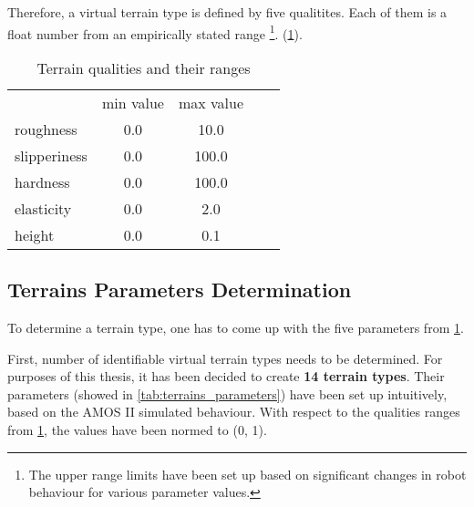 Therefore, a virtual terrain type is defined by five qualitites. Each of them is a float number from an empirically stated range \footnote{The upper range limits have been set up based on significant changes in robot behaviour for various parameter values.}. (\cref{tab:terrain_qualities}).

\begin{table}[H]
\centering
\caption{Terrain qualities and their ranges}
\label{tab:terrain_qualities}
\begin{tabular}{lccll}
             & min value & max value \\
roughness    & 0.0       & 10.0      \\
slipperiness & 0.0       & 100.0     \\
hardness     & 0.0       & 100.0     \\
elasticity   & 0.0       & 2.0       \\
height       & 0.0       & 0.1 
\end{tabular}
\end{table}

\subsection{Terrains Parameters Determination} \label{ssec:terrain_parameters}
To determine a terrain type, one has to come up with the five parameters from \cref{tab:terrain_qualities}.

First, number of identifiable virtual terrain types needs to be determined. For purposes of this thesis, it has been decided to create \textbf{14 terrain types}. Their parameters (showed in \cref{tab:terrains_parameters}) have been set up intuitively, based on the AMOS II simulated behaviour. With respect to the qualities ranges from \cref{tab:terrain_qualities}, the values have been normed to (0, 1).

